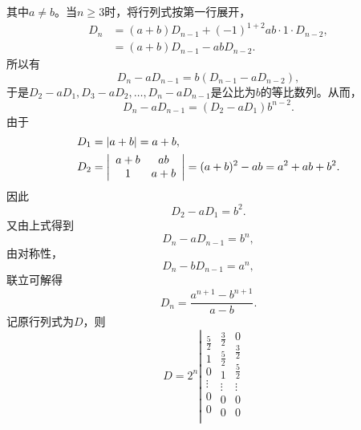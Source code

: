 \begin{enumerate}[1~]
\begin{enumerate}[1.~]
\begin{solution}
\[\]
其中$a \neq b$。当$n \ge 3$时，将行列式按第一行展开，
\begin{align*} 
D _ { n } & = ( a + b ) D _ { n - 1 } + ( - 1 ) ^ { 1 + 2 } a b \cdot 1 \cdot D _ { n - 2 }, \\ 
& = ( a + b ) D _ { n - 1 } - a b D _ { n - 2 }. \end{align*}
所以有\[
D _ { n } - a D _ { n - 1 } = b \left( D _ { n - 1 } - a D _ { n - 2 } \right),
\]
于是$D _ { 2 } - a D _ { 1 } , D _ { 3 } - a D _ { 2 } , \dots , D _ { n } - a D _ { n - 1 }$是公比为$b$的等比数列。从而，
\[
D _ { n } - a D _ { n - 1 } = \left( D _ { 2 } - a D _ { 1 } \right) b ^ { n - 2 }.
\]
由于\begin{align*}
D _ { 1 } &= | a + b | = a + b,\\
D _ { 2 } &= \left| \begin{array} { c c } { a + b } & { a b } \\ { 1 } & { a + b } \end{array} \right| = ( a + b ) ^ { 2 } - a b = a ^ { 2 } + a b + b ^ { 2 }.
\end{align*}
因此\[
D _ { 2 } - a D _ { 1 } = b ^ { 2 }.
\]
又由上式得到\[
D _ { n } - a D _ { n - 1 } = b ^ { n },
\]
由对称性，\[
D _ { n } - b D _ { n - 1 } = a ^ { n },
\]
联立可解得\[
D _ { n } = \frac { a ^ { n + 1 } - b ^ { n + 1 } } { a - b }.
\]
记原行列式为$D$，则\[
D=2^n \left| \begin{array}{c}
	\frac52\\
	1\\
	0\\
	\vdots\\
	0\\
	0\\
\end{array}\begin{array}{c}
	\frac32\\
	\frac52\\
	1\\
	\vdots\\
	0\\
	0\\
\end{array}\begin{array}{c}
	0\\
	\frac32\\
	\frac52\\
	\vdots\\
	0\\
	0\\
\end{array}\begin{array}{c}

\end{array}\]
\end{solution}
\end{enumerate}
\end{enumerate}
